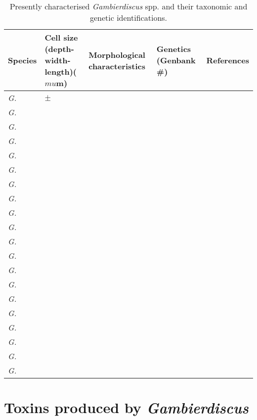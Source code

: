 \documentclass[12pt]{article}
\begin{document}
\begin{sidewaystable}[!htbp]
\caption{Presently characterised \emph{Gambierdiscus} spp. and their taxonomic and genetic identifications.}
\begin{tabular}{ |  p{4cm} | p{4cm} | p{4cm} | p{4cm} | p{4cm} | }
\hline
\textbf{Species} & \textbf{Cell size (depth-width-length)($mu$m)} & \textbf{Morphological characteristics} & \textbf{Genetics (Genbank \#)} & \textbf{References} \\
\hline
 \emph{G. } & $\pm$ &  &  & \\
\hline
 \emph{G. } &  &  &  & \\
\hline
 \emph{G. } &  &  &  & \\
\hline
 \emph{G. } &  &  &  & \\
\hline
 \emph{G. } &  &  &  & \\
\hline
 \emph{G. } &  &  &  & \\
\hline
 \emph{G. } &  &  &  & \\
\hline
 \emph{G. } &  &  &  & \\
\hline
 \emph{G. } &  &  &  & \\
\hline
 \emph{G. } &  &  &  & \\
\hline
 \emph{G. } &  &  &  & \\
\hline
 \emph{G. } &  &  &  & \\
\hline
 \emph{G. } &  &  &  & \\
\hline
 \emph{G. } &  &  &  & \\
\hline
 \emph{G. } &  &  &  & \\
\hline
 \emph{G. } &  &  &  & \\
\hline
 \emph{G. } &  &  &  & \\
\hline
 \emph{G. } &  &  &  & \\
\hline
 \emph{G. } &  &  &  & \\
\hline
 \emph{G. } &  &  &  & \\
\hline
\end{tabular}
\end{sidewaystable}
\FloatBarrier

\section{Toxins produced by \emph{Gambierdiscus}}
\end{document}

